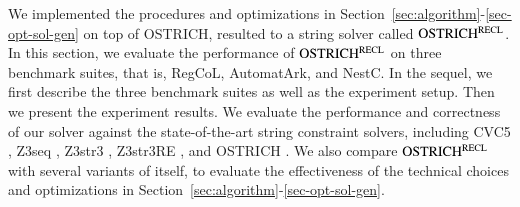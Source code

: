 
We implemented the procedures and optimizations in Section~\ref{sec:algorithm}-\ref{sec-opt-sol-gen} on top of OSTRICH, resulted to a string solver called $\rm OSTRICH^{RECL}$. 
%
In this section, we evaluate the performance of $\rm OSTRICH^{RECL}$ on three benchmark suites, that is, RegCoL, AutomatArk, and NestC. In the sequel, we first describe the three benchmark suites as well as the experiment setup. Then we present the experiment results. We evaluate the performance and correctness of our solver against the state-of-the-art string constraint solvers, including CVC5 \cite{cvc5}, Z3seq \cite{z3seq}, Z3str3 \cite{Z3-str3}, Z3str3RE \cite{BD+23}, and OSTRICH \cite{CHL+19}. We also compare $\rm OSTRICH^{RECL}$ with several variants of itself, to evaluate the effectiveness of the technical choices and optimizations in Section~\ref{sec:algorithm}-\ref{sec-opt-sol-gen}.

 




